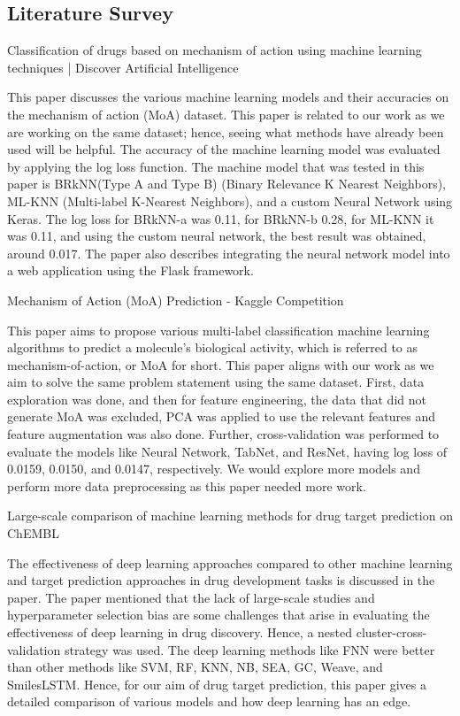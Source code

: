 \documentclass{article}
\begin{document}
\begin{multicols}{2}
\section{Literature Survey}
Classification of drugs based on mechanism of action using machine learning techniques | Discover Artificial Intelligence

This paper discusses the various machine learning models and their accuracies on the mechanism of action (MoA) dataset. This paper is related to our work as we are working on the same dataset; hence, seeing what methods have already been used will be helpful. The accuracy of the machine learning model was evaluated by applying the log loss function. The machine model that was  tested in this paper is BRkNN(Type A and Type B) (Binary Relevance K Nearest Neighbors), ML-KNN (Multi-label K-Nearest Neighbors), and a custom Neural Network using Keras. The log loss for BRkNN-a was 0.11, for BRkNN-b 0.28, for ML-KNN it was 0.11, and using the custom neural network, the best result was obtained, around 0.017. The paper also describes integrating the neural network model into a web application using the Flask framework.

Mechanism of Action (MoA) Prediction - Kaggle Competition

This paper aims to propose various multi-label classification machine learning algorithms to predict a molecule's biological activity, which is referred to as mechanism-of-action, or MoA for short. This paper aligns with our work as we aim to solve the same problem statement using the same dataset. First, data exploration was done, and then for feature engineering, the data that did not generate MoA was excluded, PCA was applied to use the relevant features and feature augmentation was also done. Further, cross-validation was performed to evaluate the models like Neural Network, TabNet, and ResNet, having log loss of  0.0159, 0.0150, and 0.0147, respectively. We would explore more models and perform more data preprocessing as this paper needed more work.

Large-scale comparison of machine learning methods for drug target prediction on ChEMBL

The effectiveness of deep learning approaches compared to other machine learning and target prediction approaches in drug development tasks is discussed in the paper.  The paper mentioned that the lack of large-scale studies and hyperparameter selection bias are some challenges that arise in evaluating the effectiveness of deep learning in drug discovery. Hence, a nested cluster-cross-validation strategy was used. The deep learning methods like FNN were better than other methods like SVM, RF, KNN, NB, SEA, GC, Weave, and SmilesLSTM. Hence, for our aim of drug target prediction, this paper gives a detailed comparison of various models and how deep learning has an edge.

\end{multicols}
\end{document}
